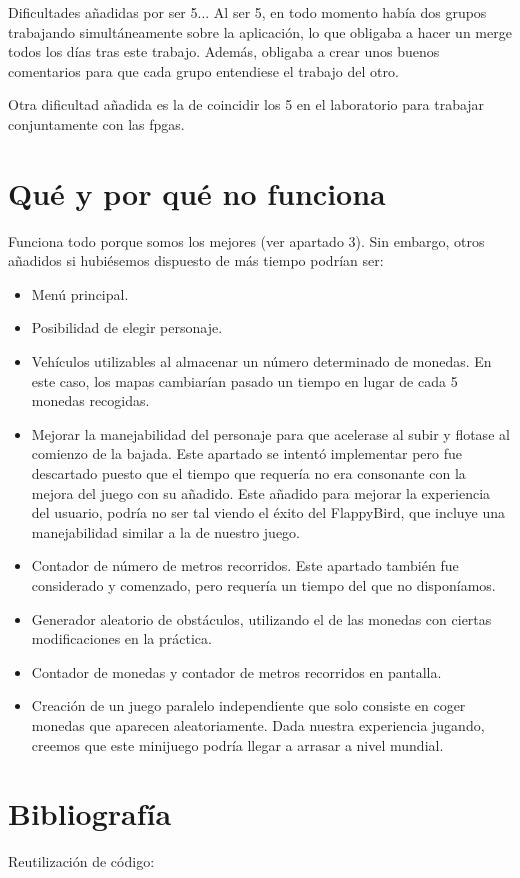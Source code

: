 \documentclass[11pt, a4paper, spanish, openright, twoside]{book}
\begin{document}
Dificultades añadidas por ser 5...
Al ser 5, en todo momento había dos grupos trabajando simultáneamente sobre la aplicación, lo que obligaba a hacer un merge todos los días tras este trabajo. Además, 
obligaba a crear unos buenos comentarios para que cada grupo entendiese el trabajo del otro. 

Otra dificultad añadida es la de coincidir los 5  en el laboratorio para trabajar conjuntamente con las fpgas.

\section{Qué y por qué no funciona}
Funciona todo porque somos los mejores (ver apartado 3). Sin embargo, otros añadidos si hubiésemos dispuesto de más tiempo podrían ser:
	
\begin{itemize}
	\item Menú principal.
	\item Posibilidad de elegir personaje.
	\item Vehículos utilizables al almacenar un número determinado de monedas. En este caso, los mapas cambiarían pasado un tiempo en lugar de cada 5 monedas recogidas.
	\item Mejorar la  manejabilidad del personaje para que acelerase al subir y flotase al comienzo de la bajada. 
	Este apartado se intentó implementar pero fue descartado puesto que el tiempo que requería no era consonante con la mejora del juego con su añadido.
	Este añadido  para mejorar la experiencia del usuario, podría no ser tal viendo el éxito del FlappyBird, que incluye una manejabilidad similar a la de nuestro juego.
	\item Contador de número de metros recorridos. Este apartado también fue considerado y comenzado, pero requería un tiempo del que no disponíamos.
	\item Generador aleatorio de obstáculos, utilizando el de las monedas con ciertas modificaciones en la práctica.
	\item Contador de monedas y contador de metros recorridos en pantalla.
	\item Creación de un juego paralelo independiente que solo consiste en coger monedas que aparecen aleatoriamente. Dada nuestra experiencia jugando, creemos que este minijuego podría llegar a arrasar a nivel mundial.
\end{itemize}


\section{Bibliografía}
Reutilización de código:
\end{document}
